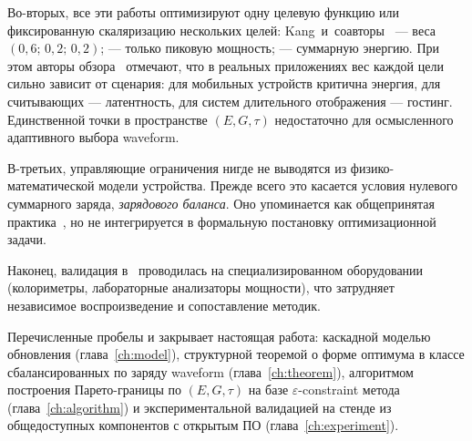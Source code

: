 Во-вторых, все эти работы оптимизируют одну целевую функцию или
фиксированную скаляризацию нескольких целей: Kang~и~соавторы~\cite{kang2025_dp_waveform}
--- веса $(0{,}6;\, 0{,}2;\, 0{,}2)$; \cite{lin2024_low_power} --- только
пиковую мощность; \cite{lai2026_e3dw_energy} --- суммарную энергию. При этом
авторы обзора~\cite{zhong2026_review} отмечают, что в реальных приложениях вес
каждой цели сильно зависит от сценария: для мобильных устройств критична
энергия, для считывающих --- латентность, для систем длительного отображения
--- гостинг. Единственной точки в пространстве $(E, G, \tau)$ недостаточно для
осмысленного адаптивного выбора waveform.

В-третьих, управляющие ограничения нигде не выводятся из
физико-математической модели устройства. Прежде всего это касается условия
нулевого суммарного заряда, \emph{зарядового баланса}. Оно упоминается как общепринятая
практика~\cite{wang2022_red_ghost, yang2021_mechanisms}, но не интегрируется в
формальную постановку оптимизационной задачи.

Наконец, валидация в~\cite{kang2025_dp_waveform,
lai2026_e3dw_energy} проводилась на специализированном оборудовании
(колориметры, лабораторные анализаторы мощности), что затрудняет независимое
воспроизведение и сопоставление методик.

Перечисленные пробелы и закрывает настоящая работа: каскадной моделью
обновления (глава~\ref{ch:model}), структурной теоремой о форме оптимума в классе
сбалансированных по заряду waveform (глава~\ref{ch:theorem}), алгоритмом
построения Парето-границы по $(E, G, \tau)$ на базе $\varepsilon$-constraint
метода (глава~\ref{ch:algorithm}) и экспериментальной валидацией на стенде из
общедоступных компонентов с открытым ПО (глава~\ref{ch:experiment}).
